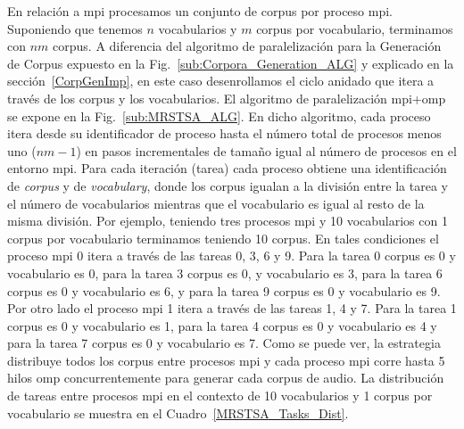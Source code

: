 {En relación a \gls{mpi} procesamos un conjunto de corpus por proceso \gls{mpi}.
Suponiendo que tenemos $n$ vocabularios y $m$ corpus por vocabulario, terminamos con $n m$ corpus.
A diferencia del algoritmo de paralelización para la Generación de Corpus expuesto en la Fig.~\ref{sub:Corpora_Generation_ALG} y explicado en la sección~\ref{CorpGenImp}, en este caso desenrollamos el ciclo anidado que itera a través de los corpus y los vocabularios.
El algoritmo de paralelización \gls{mpi}+\gls{omp} se expone en la Fig.~\ref{sub:MRSTSA_ALG}.
En dicho algoritmo, cada proceso itera desde su identificador de proceso hasta el número total de procesos menos uno ($n m - 1$) en pasos incrementales de tamaño igual al número de procesos en el entorno \gls{mpi}.
Para cada iteración (tarea) cada proceso obtiene una identificación de \emph{corpus} y de \emph{vocabulary}, donde los corpus igualan a la división entre la tarea y el número de vocabularios mientras que el vocabulario es igual al resto de la misma división.
Por ejemplo, teniendo tres procesos \gls{mpi} y 10 vocabularios con 1 corpus por vocabulario terminamos teniendo 10 corpus.
En tales condiciones el proceso \gls{mpi} 0 itera a través de las tareas 0, 3, 6 y 9.
Para la tarea 0 corpus es 0 y vocabulario es 0, para la tarea 3 corpus es 0, y vocabulario es 3, para la tarea 6 corpus es 0 y vocabulario es 6, y para la tarea 9 corpus es 0 y vocabulario es 9.
Por otro lado el proceso \gls{mpi} 1 itera a través de las tareas 1, 4 y 7.
Para la tarea 1 corpus es 0 y vocabulario es 1, para la tarea 4 corpus es 0 y vocabulario es 4 y para la tarea 7 corpus es 0 y vocabulario es 7.
Como se puede ver, la estrategia distribuye todos los corpus entre procesos \gls{mpi} y cada proceso \gls{mpi} corre hasta 5 hilos \gls{omp} concurrentemente para generar cada corpus de audio.
La distribución de tareas entre procesos \gls{mpi} en el contexto de 10 vocabularios y 1 corpus por vocabulario se muestra en el Cuadro~\ref{MRSTSA_Tasks_Dist}.

}
